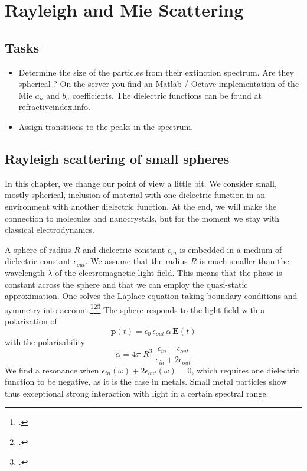 

\chapter{Rayleigh and Mie Scattering}





\section{Tasks}

\begin{itemize}
\item Determine the size of the particles from their extinction spectrum. Are they spherical ? On the server you find an Matlab / Octave implementation of the Mie $a_n$ and $b_n$ coefficients. The dielectric functions can be found at \href{https://refractiveindex.info/}{refractiveindex.info}.

\item Assign transitions to the peaks in the spectrum. 


\end{itemize}


\section{Rayleigh scattering of small spheres}


In this chapter, we change our point of view a little bit. We consider small, mostly spherical, inclusion of material with one dielectric function in an environment with another dielectric function. At the end, we will make the connection to molecules and nanocrystals, but for the moment we stay with classical electrodynanics.


A sphere of radius $R$ and dielectric constant $\epsilon_{in}$ is embedded in a medium of dielectric constant $\epsilon_{out}$. We assume that the radius $R$ is much smaller than the wavelength $\lambda$ of the electromagnetic light field. This means that the phase is constant across the sphere and that we can employ the quasi-static approximation. One solves the Laplace equation taking  boundary conditions and symmetry into account.\footcite{Jackson-ED}\footcite[excercise 2.4.2]{Nolting-ED}\footcite[chapter 5.2]{BH-book}
The sphere responds to the light field with a polarization of
\[
 \mathbf{p}(t) = \epsilon_0 \,  \epsilon_{out} \, \alpha \, \mathbf{E}(t)
\]
with the polarisability
\[
 \alpha = 4 \pi  \; R^3 \; \frac{\epsilon_{in} - \epsilon_{out}}{\epsilon_{in} + 2 \epsilon_{out}}
\]
We find a resonance when $\epsilon_{in}(\omega) + 2 \epsilon_{out}(\omega) = 0$, which requires one dielectric function to be negative, as it is the case in metals. Small metal particles show thus exceptional strong interaction with light in a certain spectral range.


